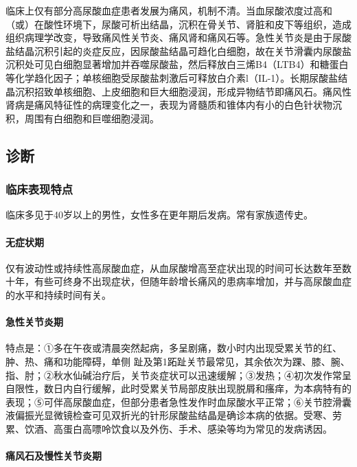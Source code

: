 临床上仅有部分高尿酸血症患者发展为痛风，机制不清。当血尿酸浓度过高和（或）在酸性环境下，尿酸可析出结晶，沉积在骨关节、肾脏和皮下等组织，造成组织病理学改变，导致痛风性关节炎、痛风肾和痛风石等。急性关节炎是由于尿酸盐结晶沉积引起的炎症反应，因尿酸盐结晶可趋化白细胞，故在关节滑囊内尿酸盐沉积处可见白细胞显著增加并吞噬尿酸盐，然后释放白三烯B4（LTB4）和糖蛋白等化学趋化因子；单核细胞受尿酸盐刺激后可释放白介素l（IL-1）。长期尿酸盐结晶沉积招致单核细胞、上皮细胞和巨大细胞浸润，形成异物结节即痛风石。痛风性肾病是痛风特征性的病理变化之一，表现为肾髓质和锥体内有小的白色针状物沉积，周围有白细胞和巨噬细胞浸润。

\subsection{诊断}

\subsubsection{临床表现特点}

临床多见于40岁以上的男性，女性多在更年期后发病。常有家族遗传史。

\paragraph{无症状期}

仅有波动性或持续性高尿酸血症，从血尿酸增高至症状出现的时间可长达数年至数十年，有些可终身不出现症状，但随年龄增长痛风的患病率增加，并与高尿酸血症的水平和持续时间有关。

\paragraph{急性关节炎期}

特点是：①多在午夜或清晨突然起病，多呈剧痛，数小时内出现受累关节的红、肿、热、痛和功能障碍，单侧
{}
趾及第1跖趾关节最常见，其余依次为踝、膝、腕、指、肘；②秋水仙碱治疗后，关节炎症状可以迅速缓解；③发热；④初次发作常呈自限性，数日内自行缓解，此时受累关节局部皮肤出现脱屑和瘙痒，为本病特有的表现；⑤可伴高尿酸血症，但部分患者急性发作时血尿酸水平正常；⑥关节腔滑囊液偏振光显微镜检查可见双折光的针形尿酸盐结晶是确诊本病的依据。受寒、劳累、饮酒、高蛋白高嘌呤饮食以及外伤、手术、感染等均为常见的发病诱因。

\paragraph{痛风石及慢性关节炎期}

